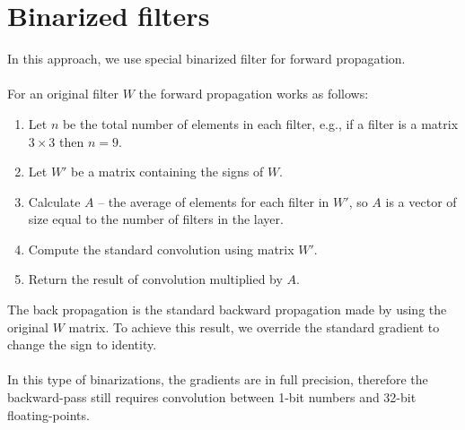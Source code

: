 \documentclass[licencjacka]{pracamgr}
\begin{document}
	\section{Binarized filters}
        In this approach, we use special binarized filter for forward propagation.
        \\\\
        For an original filter $W$ the forward propagation works as follows:
        \begin{enumerate}
                \item Let $n$ be the total number of elements in each filter, e.g., if a filter is a matrix $3 \times 3$ then $n=9$.
                \item Let $W'$ be a matrix containing the signs of $W$.
                \item Calculate $A$ -- the average of elements for each filter in $W'$, so $A$ is a vector of size equal to the number of filters in the layer.
                \item Compute the standard convolution using matrix $W'$.
                \item Return the result of convolution multiplied by $A$.
        \end{enumerate}
        The back propagation is the standard backward propagation made by using the original $W$ matrix. To achieve this result, we override the standard gradient to change the sign to identity.
        \\\\
        In this type of binarizations, the gradients are in full precision, therefore the backward-pass still requires convolution between 1-bit numbers and 32-bit floating-points.
\end{document}
